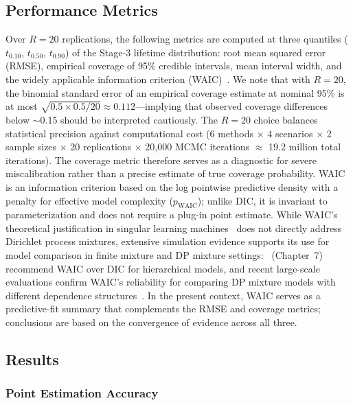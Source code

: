 \documentclass[a4paper,fleqn,longmktitle]{cas-sc}
\begin{document}
\subsection{Performance Metrics}

Over $R = 20$ replications, the following metrics are computed at three quantiles ($t_{0.10}$, $t_{0.50}$, $t_{0.90}$) of the Stage-3 lifetime distribution: root mean squared error (RMSE), empirical coverage of 95\% credible intervals, mean interval width, and the widely applicable information criterion (WAIC)~\cite{Watanabe2010}. We note that with $R=20$, the binomial standard error of an empirical coverage estimate at nominal 95\% is at most $\sqrt{0.5\times0.5/20}\approx0.112$---implying that observed coverage differences below $\sim$0.15 should be interpreted cautiously. The $R=20$ choice balances statistical precision against computational cost (6 methods $\times$ 4 scenarios $\times$ 2 sample sizes $\times$ 20 replications $\times$ 20,000 MCMC iterations $\approx$ 19.2 million total iterations). The coverage metric therefore serves as a diagnostic for severe miscalibration rather than a precise estimate of true coverage probability. WAIC is an information criterion based on the log pointwise predictive density with a penalty for effective model complexity ($p_{\mathrm{WAIC}}$); unlike DIC, it is invariant to parameterization and does not require a plug-in point estimate. While WAIC's theoretical justification in singular learning machines~\cite{Watanabe2010} does not directly address Dirichlet process mixtures, extensive simulation evidence supports its use for model comparison in finite mixture and DP mixture settings:~\cite{Gelman2013} (Chapter~7) recommend WAIC over DIC for hierarchical models, and recent large-scale evaluations confirm WAIC's reliability for comparing DP mixture models with different dependence structures~\cite{Quintana2022}. In the present context, WAIC serves as a predictive-fit summary that complements the RMSE and coverage metrics; conclusions are based on the convergence of evidence across all three.

\subsection{Results}

\subsubsection{Point Estimation Accuracy}
\label{sec:sim_rmse}
\end{document}
